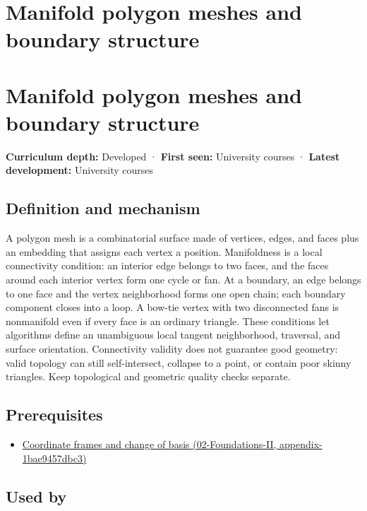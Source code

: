 \hypertarget{appendix-fab348609369}{}
\section*{Manifold polygon meshes and boundary structure}
\section{Manifold polygon meshes and boundary structure}\label{appendix-fab348609369-manifold-polygon-meshes-and-boundary-structure}

\textbf{Curriculum depth:} Developed · \textbf{First seen:} University courses · \textbf{Latest development:} University courses

\subsection{Definition and mechanism}\label{appendix-fab348609369-definition-and-mechanism}

A polygon mesh is a combinatorial surface made of vertices, edges, and faces plus an embedding that assigns each vertex a position. Manifoldness is a local connectivity condition: an interior edge belongs to two faces, and the faces around each interior vertex form one cycle or fan. At a boundary, an edge belongs to one face and the vertex neighborhood forms one open chain; each boundary component closes into a loop. A bow-tie vertex with two disconnected fans is nonmanifold even if every face is an ordinary triangle. These conditions let algorithms define an unambiguous local tangent neighborhood, traversal, and surface orientation. Connectivity validity does not guarantee good geometry: valid topology can still self-intersect, collapse to a point, or contain poor skinny triangles. Keep topological and geometric quality checks separate.

\subsection{Prerequisites}\label{appendix-fab348609369-prerequisites}

\begin{itemize}
\tightlist
\item
  \href{../02-Foundations-II/main.pdf\#nameddest=appendix-1bae9457dbc3}{Coordinate frames and change of basis (02-Foundations-II, appendix-1bae9457dbc3)}
\end{itemize}

\subsection{Used by}\label{appendix-fab348609369-used-by}


